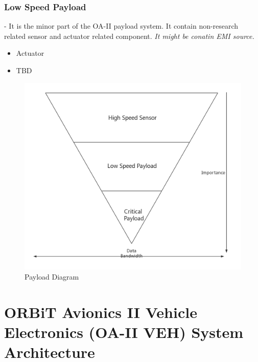 \documentclass[12pt,article]{memoir}
\begin{document}
\subsection{Low Speed Payload} - It is the minor part of the OA-II payload system. It contain non-research related sensor and actuator related component. \textit{It might be conatin EMI source.}
\begin{itemize}
\item Actuator
\item TBD
\end{itemize}
\begin{figure}[htp]
\includegraphics[width=\textwidth]{payloadCata.png}
 \caption{Payload Diagram}	
\end{figure}
\chapter{ORBiT Avionics II Vehicle Electronics (OA-II VEH) System Architecture}
\end{document}
